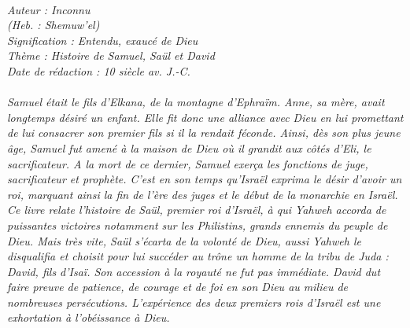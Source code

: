 \BFont
\noindent\hrulefill
{\footnotesize
\textit{
\bigskip
{\centering{}
\\Auteur : Inconnu
\\(Heb. : Shemuw'el)
\\Signification : Entendu, exaucé de Dieu
\\Thème : Histoire de Samuel, Saül et David
\\Date de rédaction : 10 siècle av. J.-C.\\}
}
\textit{
\\Samuel était le fils d'Elkana, de la montagne d'Ephraïm. Anne, sa mère, avait longtemps désiré un enfant. Elle fit donc une alliance avec Dieu en lui promettant de lui consacrer son premier fils si il la rendait féconde. Ainsi, dès son plus jeune âge, Samuel fut amené à la maison de Dieu où il grandit aux côtés d'Eli, le sacrificateur. A la mort de ce dernier, Samuel exerça les fonctions de juge, sacrificateur et prophète. C'est en son temps qu'Israël exprima le désir d'avoir un roi, marquant ainsi la fin de l'ère des juges et le début de la monarchie en Israël.
\\Ce livre relate l'histoire de Saül, premier roi d'Israël, à qui Yahweh accorda de puissantes victoires notamment sur les Philistins, grands ennemis du peuple de Dieu. Mais très vite, Saül s'écarta de la volonté de Dieu, aussi Yahweh le disqualifia et choisit pour lui succéder au trône un homme de la tribu de Juda : David, fils d'Isaï. Son accession à la royauté ne fut pas immédiate. David dut faire preuve de patience, de courage et de foi en son Dieu au milieu de nombreuses persécutions. L'expérience des deux premiers rois d'Israël est une exhortation à l'obéissance à Dieu.\bigskip
}
}
\par\nobreak\noindent\hrulefill
